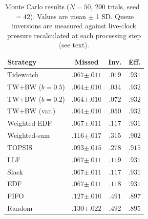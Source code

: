 \documentclass[11pt]{article}
\begin{document}
\begin{table}[t]
\centering
\caption{Monte Carlo results ($N{=}50$, 200 trials, seed~$= 42$).
Values are mean $\pm$ 1 SD.
Queue inversions are measured against live-clock pressure
recalculated at each processing step (see text).}
\label{tab:mc50}
\begin{tabular}{@{}lccc@{}}
\toprule
\textbf{Strategy} & \textbf{Missed} & \textbf{Inv.} &
  \textbf{Eff.} \\
\midrule
Tidewatch          & $.067 {\scriptstyle\pm .011}$ & $.019$ & $.931$ \\
TW+BW ($b{=}0.5$) & $.064 {\scriptstyle\pm .010}$ & $.034$ & $.932$ \\
TW+BW ($b{=}0.2$) & $.064 {\scriptstyle\pm .010}$ & $.072$ & $.932$ \\
TW+BW (var.)       & $.064 {\scriptstyle\pm .010}$ & $.050$ & $.932$ \\
Weighted-EDF       & $.067 {\scriptstyle\pm .011}$ & $.117$ & $.931$ \\
Weighted-sum       & $.116 {\scriptstyle\pm .017}$ & $.315$ & $.902$ \\
TOPSIS             & $.093 {\scriptstyle\pm .015}$ & $.278$ & $.915$ \\
LLF                & $.067 {\scriptstyle\pm .011}$ & $.119$ & $.931$ \\
Slack              & $.067 {\scriptstyle\pm .011}$ & $.117$ & $.931$ \\
EDF                & $.067 {\scriptstyle\pm .011}$ & $.118$ & $.931$ \\
FIFO               & $.127 {\scriptstyle\pm .010}$ & $.491$ & $.897$ \\
Random             & $.130 {\scriptstyle\pm .022}$ & $.492$ & $.895$ \\
\bottomrule
\end{tabular}
\end{table}
\end{document}
